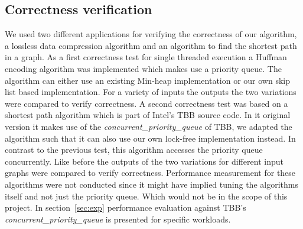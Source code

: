 \subsection{Correctness verification}
\label{subsec:corr_ver}
We used two different applications for verifying the correctness of our algorithm, a lossless data compression algorithm and an algorithm to find the shortest path in a graph. 
As a first correctness test for single threaded execution a Huffman encoding algorithm was implemented which makes use a priority queue. The algorithm can either use an existing Min-heap implementation or our own skip list based implementation. For a variety of inputs the outputs the two variations were compared to verify correctness.
A second correctness test was based on a shortest path algorithm which is part of Intel's TBB source code. In it original version it makes use of the \textit{concurrent\_priority\_queue} of TBB, we adapted the algorithm such that it can also use our own lock-free implementation instead. In contrast to the previous test, this algorithm accesses the priority queue concurrently. Like before the outputs of the two variations for different input graphs were compared to verify correctness. Performance measurement for these algorithms were not conducted since it might have implied tuning the algorithms itself and not just the priority queue. Which would not be in the scope of this project. In section~\ref{sec:exp} performance evaluation against TBB's \textit{concurrent\_priority\_queue} is presented for specific workloads.

